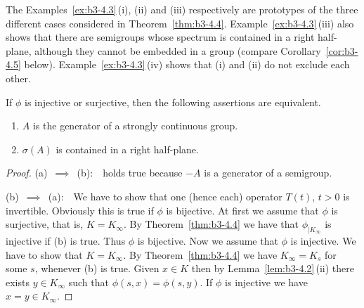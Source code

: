 The Examples~\ref{ex:b3-4.3}\,(i), (ii) and (iii) respectively are prototypes of the three different cases considered in Theorem~\ref{thm:b3-4.4}.
Example~\ref{ex:b3-4.3}\,(iii) also shows that there are semigroups whose spectrum is contained in a right half-plane, although they cannot be embedded in a group (compare Corollary~\ref{cor:b3-4.5} below).
Example~\ref{ex:b3-4.3}\,(iv) shows that (i) and (ii) do not exclude each other.
\begin{corollary}\label{cor:b3-4.5}
	If\/ $\phi$ is injective or surjective, then the following assertions are equivalent.
	\begin{enumerate}[\upshape (a)]
		\item 
		$A$ is the generator of a strongly continuous group.
		
		\item 
		$\sigma(A)$ is contained in a right half-plane.
	\end{enumerate}
\end{corollary}
\begin{proof}
	(a)~$\implies$~(b):\ \  holds true because $-A$ is a generator of a semigroup.
	
	(b)~$\implies$~(a):\ \ 
	We have to show that one (hence each) operator $T(t)$, $t > 0$ is invertible.
	Obviously this is true if\/ $\phi$ is bijective.
	At first we assume that $\phi$ is surjective, that is, $K = K_{\infty}$.
	By Theorem~\ref{thm:b3-4.4} we have that $\phi_{|K_{\infty}}$ is injective if (b) is true.
	Thus $\phi$ is bijective.
	Now we assume that $\phi$ is injective.
	We have to show that $K = K_{\infty}$.
	By Theorem~\ref{thm:b3-4.4} we have $K_{\infty} = K_{s}$ for some $s$, whenever (b) is true.
	Given $x \in K$ then by Lemma~\ref{lem:b3-4.2}\,(ii) there exists $y \in K_{\infty}$ such that $\phi(s,x) = \phi(s,y)$.
	If\/ $\phi$ is injective we have $x = y \in K_{\infty}$.
\end{proof}
